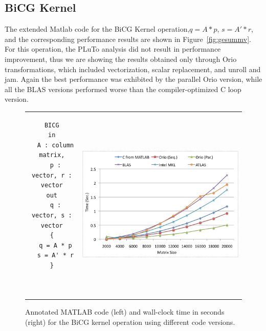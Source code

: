 \documentclass[11pt]{article}
\begin{document}
\subsection{BiCG Kernel}

The extended Matlab code for the BiCG Kernel operation,$q = A * p$, $s = A' * r$,
and the corresponding performance results are shown in Figure~\ref{fig:gesummv}. For this operation, the PLuTo analysis did not result in performance improvement, thus we are showing the results obtained only through Orio transformations, which included vectorization, scalar replacement, and unroll and jam. Again the best performance was exhibited by the parallel Orio version, while all the BLAS versions performed worse than the compiler-optimized C loop version.


\begin{figure}[htp]
\centering
\begin{tabular}{cc}
\begin{minipage}[b]{.3\textwidth}
\footnotesize
\begin{verbatim}
BICG
in
  A : column matrix,
  p : vector, r : vector
out
  q : vector, s : vector
{
  q = A * p
  s = A' * r
}



\end{verbatim}
\end{minipage}
&
\begin{minipage}[b]{.6\textwidth}
\includegraphics[width=\textwidth]{figures/bicgkernel.png}
\end{minipage}\\
\end{tabular}
\caption{Annotated MATLAB code (left) and wall-clock time in seconds (right) for the BiCG kernel operation using different code versions.}
\label{fig:bicgkernel}
\end{figure}
\end{document}
